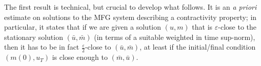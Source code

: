 \documentclass[10pt,a4paper,nouppercase,nowrite]{article}
\numberwithin{equation}{section}
\newcommand{\di}{{\rm d}}
\newcommand{\eps}{\varepsilon}
\theoremstyle{definition}
\begin{document}
	
\medskip
	
	The first result is technical, but crucial to develop what follows. It is an \textit{a priori} estimate on solutions to the MFG system describing a contractivity property; in particular, it states that if we are given a solution $(u,m)$ that is $\eps$-close to the stationary solution $(\bar u, \bar m)$ (in terms of a suitable weighted in time sup-norm), then it has to be in fact $\frac\eps2$-close to $(\bar u, \bar m)$, at least if the initial/final condition $(m(0), u_T)$ is close enough to $(\bar m, \bar u)$.
\end{document}
